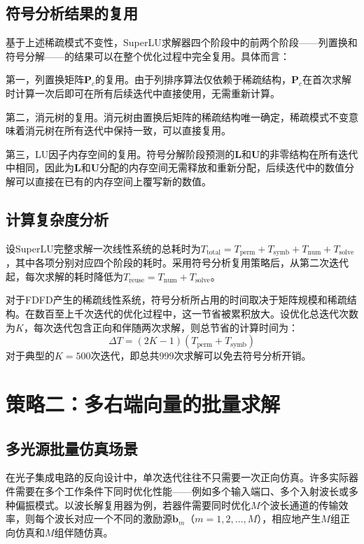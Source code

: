 \subsection{符号分析结果的复用}

基于上述稀疏模式不变性，SuperLU求解器四个阶段中的前两个阶段——列置换和符号分解——的结果可以在整个优化过程中完全复用。具体而言：

第一，列置换矩阵$\boldsymbol{P}_c$的复用。由于列排序算法仅依赖于稀疏结构，$\boldsymbol{P}_c$在首次求解时计算一次后即可在所有后续迭代中直接使用，无需重新计算。

第二，消元树的复用。消元树由置换后矩阵的稀疏结构唯一确定，稀疏模式不变意味着消元树在所有迭代中保持一致，可以直接复用。

第三，LU因子内存空间的复用。符号分解阶段预测的$\boldsymbol{L}$和$\boldsymbol{U}$的非零结构在所有迭代中相同，因此为$\boldsymbol{L}$和$\boldsymbol{U}$分配的内存空间无需释放和重新分配，后续迭代中的数值分解可以直接在已有的内存空间上覆写新的数值。

\subsection{计算复杂度分析}

设SuperLU完整求解一次线性系统的总耗时为$T_{\mathrm{total}} = T_{\mathrm{perm}} + T_{\mathrm{symb}} + T_{\mathrm{num}} + T_{\mathrm{solve}}$，其中各项分别对应四个阶段的耗时。采用符号分析复用策略后，从第二次迭代起，每次求解的耗时降低为$T_{\mathrm{reuse}} = T_{\mathrm{num}} + T_{\mathrm{solve}}$。

对于FDFD产生的稀疏线性系统，符号分析所占用的时间取决于矩阵规模和稀疏结构。在数百至上千次迭代的优化过程中，这一节省被累积放大。设优化总迭代次数为$K$，每次迭代包含正向和伴随两次求解，则总节省的计算时间为：
\begin{equation}
  \Delta T = (2K - 1)(T_{\mathrm{perm}} + T_{\mathrm{symb}})
  \label{eq:time_saving}
\end{equation}
对于典型的$K = 500$次迭代，即总共999次求解可以免去符号分析开销。

\section{策略二：多右端向量的批量求解}

\subsection{多光源批量仿真场景}

在光子集成电路的反向设计中，单次迭代往往不只需要一次正向仿真。许多实际器件需要在多个工作条件下同时优化性能——例如多个输入端口、多个入射波长或多种偏振模式。以波长解复用器为例，若器件需要同时优化$M$个波长通道的传输效率，则每个波长对应一个不同的激励源$\boldsymbol{b}_m$（$m = 1, 2, \ldots, M$），相应地产生$M$组正向仿真和$M$组伴随仿真。

